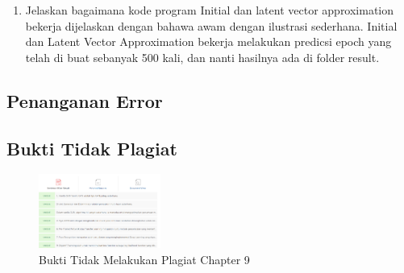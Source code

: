 \begin{enumerate}
		

        	\item Jelaskan bagaimana kode program Initial dan latent vector approximation bekerja dijelaskan dengan bahawa awam dengan ilustrasi sederhana.
Initial dan Latent Vector Approximation bekerja melakukan predicsi epoch yang telah di buat sebanyak 500 kali, dan nanti hasilnya ada di folder result.

		


\end{enumerate}

\subsection{Penanganan Error}

\subsection{Bukti Tidak Plagiat}
\begin{figure}[H]
\centering
	\includegraphics[width=4cm]{figures/1174008/9/bukticekplagiarismechapter9.PNG}
	\caption{Bukti Tidak Melakukan Plagiat Chapter 9}
\end{figure}